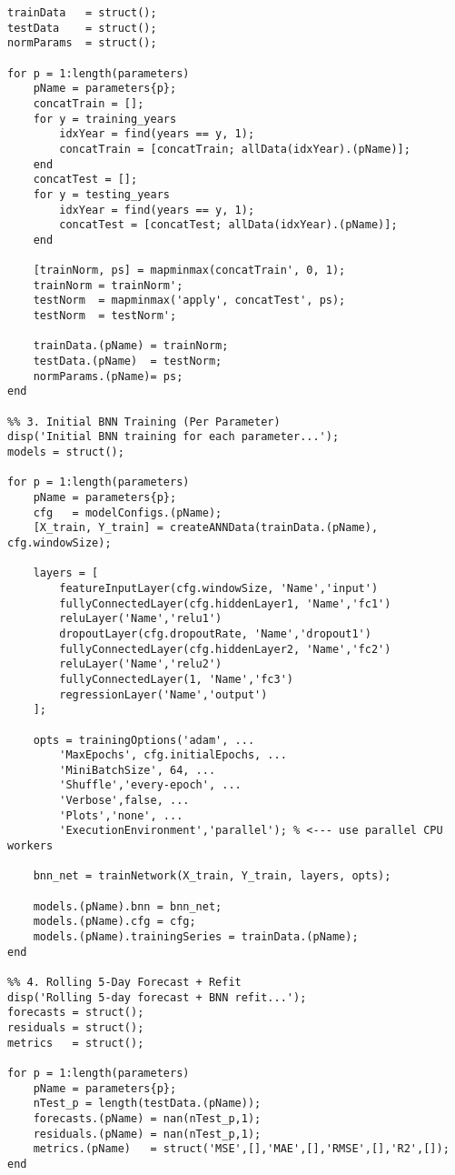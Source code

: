 \begin{verbatim}
trainData   = struct();
testData    = struct();
normParams  = struct();

for p = 1:length(parameters)
    pName = parameters{p};
    concatTrain = [];
    for y = training_years
        idxYear = find(years == y, 1);
        concatTrain = [concatTrain; allData(idxYear).(pName)];
    end
    concatTest = [];
    for y = testing_years
        idxYear = find(years == y, 1);
        concatTest = [concatTest; allData(idxYear).(pName)];
    end
    
    [trainNorm, ps] = mapminmax(concatTrain', 0, 1);
    trainNorm = trainNorm';
    testNorm  = mapminmax('apply', concatTest', ps);
    testNorm  = testNorm';
    
    trainData.(pName) = trainNorm;
    testData.(pName)  = testNorm;
    normParams.(pName)= ps;
end

%% 3. Initial BNN Training (Per Parameter)
disp('Initial BNN training for each parameter...');
models = struct();

for p = 1:length(parameters)
    pName = parameters{p};
    cfg   = modelConfigs.(pName);
    [X_train, Y_train] = createANNData(trainData.(pName), cfg.windowSize);
    
    layers = [
        featureInputLayer(cfg.windowSize, 'Name','input')
        fullyConnectedLayer(cfg.hiddenLayer1, 'Name','fc1')
        reluLayer('Name','relu1')
        dropoutLayer(cfg.dropoutRate, 'Name','dropout1')
        fullyConnectedLayer(cfg.hiddenLayer2, 'Name','fc2')
        reluLayer('Name','relu2')
        fullyConnectedLayer(1, 'Name','fc3')
        regressionLayer('Name','output')
    ];
    
    opts = trainingOptions('adam', ...
        'MaxEpochs', cfg.initialEpochs, ...
        'MiniBatchSize', 64, ...
        'Shuffle','every-epoch', ...
        'Verbose',false, ...
        'Plots','none', ...
        'ExecutionEnvironment','parallel'); % <--- use parallel CPU workers
    
    bnn_net = trainNetwork(X_train, Y_train, layers, opts);
    
    models.(pName).bnn = bnn_net;
    models.(pName).cfg = cfg;
    models.(pName).trainingSeries = trainData.(pName);
end

%% 4. Rolling 5-Day Forecast + Refit
disp('Rolling 5-day forecast + BNN refit...');
forecasts = struct();
residuals = struct();
metrics   = struct();

for p = 1:length(parameters)
    pName = parameters{p};
    nTest_p = length(testData.(pName));
    forecasts.(pName) = nan(nTest_p,1);
    residuals.(pName) = nan(nTest_p,1);
    metrics.(pName)   = struct('MSE',[],'MAE',[],'RMSE',[],'R2',[]);
end


\end{verbatim}
